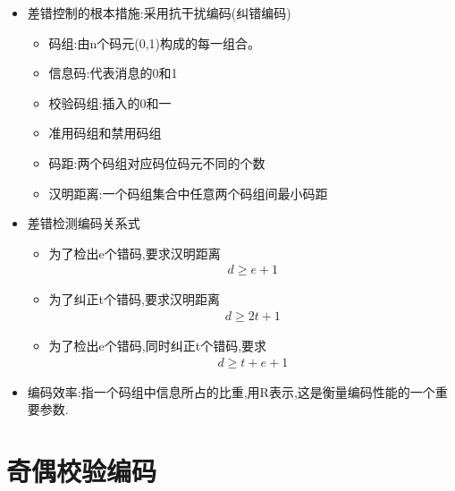\documentclass[a4paper,12pt,notitlepage]{article}
\begin{document}
\begin{itemize}
	\item 差错控制的根本措施:采用抗干扰编码(纠错编码)
	\begin{itemize}
		\item 码组:由n个码元(0,1)构成的每一组合。
		\item 信息码:代表消息的0和1
		\item 校验码组:插入的0和一
		\item 准用码组和禁用码组
		\item 码距:两个码组对应码位码元不同的个数
		\item 汉明距离:一个码组集合中任意两个码组间最小码距
	\end{itemize}
	\item 差错检测编码关系式
	\begin{itemize}
		\item 为了检出e个错码,要求汉明距离
\begin{align*}
	d \geq e+1
\end{align*}
		\item 为了纠正t个错码,要求汉明距离
\begin{align*}
	d \geq 2t+1
\end{align*}
		\item 为了检出e个错码,同时纠正t个错码,要求
\begin{align*}
	d \geq t + e + 1
\end{align*}
	\end{itemize}
	\item 编码效率:指一个码组中信息所占的比重,用R表示,这是衡量编码性能的一个重要参数.
\end{itemize}

\section{奇偶校验编码}
\end{document}
